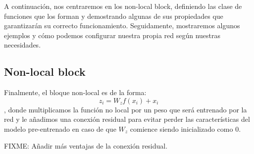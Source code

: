 A continuación, nos centraremos en los non-local block, definiendo las clase de funciones que los forman y demostrando algunas de sus propiedades que garantizarán su correcto funcionamiento. Seguidamente, mostraremos algunos ejemplos y cómo podemos configurar nuestra propia red según nuestras necesidades.\newline

\subsection{Non-local block}
Finalmente, el bloque non-local es de la forma: $$z_i=W_z f(x_i) + x_i$$, donde multiplicamos la función no local por un peso que será entrenado por la red y le añadimos una conexión residual para evitar perder las características del modelo pre-entrenado en caso de que $W_z$ comience siendo inicializado como $0$.

FIXME: Añadir más ventajas de la conexión residual.
